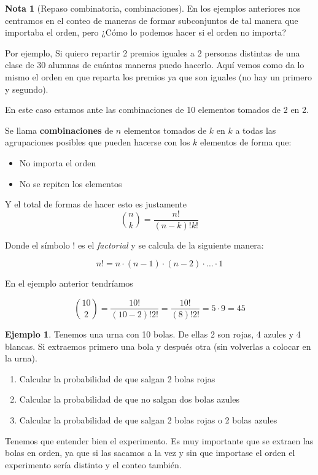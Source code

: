 \documentclass[]{book}
\theoremstyle{plain}
\theoremstyle{definition}
\newtheorem{note}[theorem]{Nota}
\newtheorem{example}[theorem]{Ejemplo}
\theoremstyle{definition} %
\begin{document}
\begin{note}[Repaso combinatoria, combinaciones]

En los ejemplos anteriores nos centramos en el conteo de maneras de formar subconjuntos de tal manera que importaba el orden, pero ¿Cómo lo podemos hacer si el orden no importa?

Por ejemplo, Si quiero repartir 2 premios iguales a 2 personas distintas de una clase de 30 alumnas de cuántas maneras puedo hacerlo. 
Aquí vemos como  da lo mismo el orden en que reparta los premios ya que son iguales (no hay un primero y segundo).

En este caso estamos ante las combinaciones de 10 elementos tomados de 2 en 2.

Se llama \textbf{combinaciones} de $n$ elementos tomados de  $k$ en $k$
a todas las agrupaciones posibles que pueden hacerse con los 
$k$ elementos de forma que:
\begin{itemize}
  \item No importa el orden
  \item No se repiten los elementos
\end{itemize}

Y el total de formas de hacer esto es justamente
\[{n \choose k} = \frac{n!}{(n-k)! k!}\]

Donde el símbolo $!$ es el \emph{factorial} y se calcula de la siguiente manera:

\[n! = n \cdot (n-1) \cdot (n-2) \cdot \ldots \cdot 1\]

En el ejemplo anterior tendríamos 

\[{10 \choose 2} = \frac{10!}{(10-2)! 2!} = \frac{10!}{(8)! 2!} = 5\cdot 9 = 45\]


\begin{example}
  Tenemos una urna con 10 bolas. De ellas 2 son rojas, 4 azules y 4 blancas. Si extraemos primero una bola y después otra (sin volverlas a colocar en la urna).
  \begin{enumerate}[(1)]
    \item Calcular la probabilidad de que salgan 2 bolas rojas
    \item Calcular la probabilidad de que no salgan dos bolas azules
    \item Calcular la probabilidad de que salgan 2 bolas rojas o 2 bolas azules
  \end{enumerate}

  Tenemos que entender bien el experimento. Es muy importante que se extraen las bolas en orden, ya que si las sacamos a la vez 
  y sin que importase el orden el experimento sería distinto y el conteo también.


\end{example}
\end{note}
\end{document}
